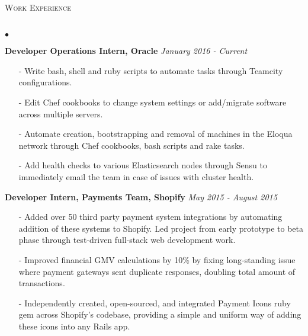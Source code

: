 \documentclass[10pt]{article}
\newcommand{\lineunder}{\vspace*{-8pt} \\ \hspace*{-18pt} \hrulefill \\}
\newcommand{\header}[1]{{\hspace*{-15pt}\vspace*{6pt} \textsc{#1}} \vspace*{-6pt} \lineunder }
\newenvironment{achievements}{\begin{list}{$\bullet$}{\topsep 0pt \itemsep -1.5pt \leftmargin 5pt}}{\vspace*{4pt}\end{list}}
\begin{document}
\header{\fontsize{11}{12}\selectfont  Work Experience}
\begin{achievements}
\item \textbf{Developer Operations Intern, Oracle} \hfill \textit {January 2016 - Current}
\begin{itemize}
\item[-]Write bash, shell and ruby scripts to automate tasks through Teamcity configurations.
\vspace{2pt}
\item[-]Edit Chef cookbooks to change system settings or add/migrate software across multiple servers.
\vspace{2pt}
\item[-]Automate creation, bootstrapping and removal of machines in the Eloqua network through Chef cookbooks, bash scripts and rake tasks.
\vspace{2pt}
\item[-]Add health checks to various Elasticsearch nodes through Sensu to immediately email the team in case of issues with cluster health.
\end{itemize}
\vspace{2pt}
\item \textbf{Developer Intern, Payments Team, Shopify} \hfill \textit {May 2015 - August 2015}
\begin{itemize}
\item[-]Added over 50 third party payment system integrations by automating addition of these systems to Shopify. Led project from early prototype to beta phase through test-driven full-stack web development work.
\vspace{2pt}
\item[-]Improved financial GMV calculations by 10\% by fixing long-standing issue where payment gateways sent duplicate responses, doubling total amount of transactions. 
\vspace{2pt}
\item[-]Independently created, open-sourced, and integrated Payment Icons ruby gem across Shopify's codebase, providing a simple and uniform way of adding these icons into any Rails app.
\end{itemize}
\end{achievements}

\vspace{8pt}
\end{document}
